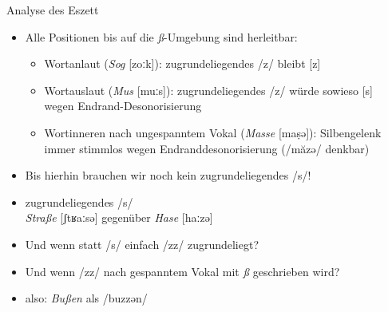 \begin{frame}
  {Analyse des Eszett}
  \pause
  \begin{itemize}[<+->]
    \item \alert{Alle Positionen bis auf die \textit{ß}-Umgebung sind herleitbar:}
      \begin{itemize}[<+->]
        \item Wortanlaut (\textit{Sog} [zoːk]): zugrundeliegendes /z/ bleibt [z]
        \item Wortauslaut (\textit{Mus} [muːs]): zugrundeliegendes /z/ würde sowieso [s]\\
          wegen Endrand-Desonorisierung
        \item Wortinneren nach ungespanntem Vokal (\textit{Masse} [maṣə]): \alert{Silbengelenk}\\
          immer stimmlos wegen Endranddesonorisierung (/măzə/ denkbar)
      \end{itemize}
      \Halbzeile
    \item \alert{Bis hierhin brauchen wir noch kein zugrundeliegendes /s/!}
      \Halbzeile
    \item zugrundeliegendes /s/ \\
      \textit{Straße} [ʃtʁaːsə] gegenüber \textit{Hase} [haːzə]
    \item \alert{Und wenn statt /s/ einfach /zz/ zugrundeliegt?}
    \item \alert{Und wenn /zz/ nach gespanntem Vokal mit \textit{ß} geschrieben wird?}
    \item also: \textit{Bußen} als /buzzən/ \phopro [buːssən]
  \end{itemize}
\end{frame}


